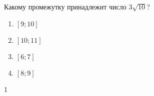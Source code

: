 \begin{ex}
	Какому промежутку принадлежит число $3\sqrt{10}$?
	
	\selectanswer
	\begin{multicols}{4}
		\begin{enumerate}[label=\arabic*)]
			\item $[9;10]$
			\item $[10;11]$
			\item $[6;7]$
			\item $[8;9]$
		\end{enumerate}
	\end{multicols}
	\begin{answer}
		1
	\end{answer}
\end{ex}